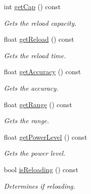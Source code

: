 \begin{DoxyCompactItemize}
int \mbox{\hyperlink{class_gun_ab9f8328c07d8155fd378d30a41e60947}{get\+Cap}} () const
\begin{DoxyCompactList}\small\item\em Gets the reload capacity. \end{DoxyCompactList}\item 
float \mbox{\hyperlink{class_gun_a32315eb4c4893cb6aaf34945be1e10d9}{get\+Reload}} () const
\begin{DoxyCompactList}\small\item\em Gets the reload time. \end{DoxyCompactList}\item 
float \mbox{\hyperlink{class_gun_ab4fccf96a54546120ab47d8fcc05b730}{get\+Accuracy}} () const
\begin{DoxyCompactList}\small\item\em Gets the accuracy. \end{DoxyCompactList}\item 
float \mbox{\hyperlink{class_gun_ae6e568c31cb8f7f5ecc5afbbdb796479}{get\+Range}} () const
\begin{DoxyCompactList}\small\item\em Gets the range. \end{DoxyCompactList}\item 
float \mbox{\hyperlink{class_gun_ac2b674cc15fc482a38174a418b51a443}{get\+Power\+Level}} () const
\begin{DoxyCompactList}\small\item\em Gets the power level. \end{DoxyCompactList}\item 
bool \mbox{\hyperlink{class_gun_af85b97414bec9c7374548562da235973}{is\+Reloading}} () const
\begin{DoxyCompactList}\small\item\em Determines if reloading. \end{DoxyCompactList}\end{DoxyCompactItemize}
